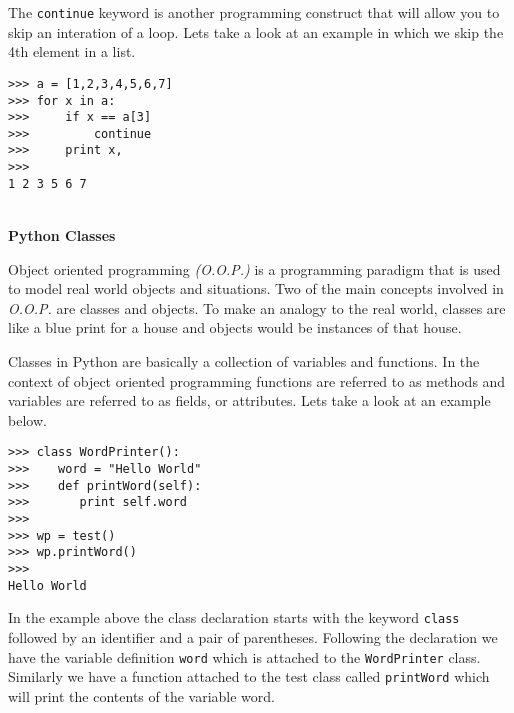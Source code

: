 \documentclass[letterpaper,11pt]{article}
\begin{document}
\par{The \texttt{continue} keyword is another programming construct that will
allow you to skip an interation of a loop. Lets take a look at an example in
which we skip the 4th element in a list.}
\begin{minipage}{.5\textwidth}
    \begin{tcolorbox}
        \begin{footnotesize}
            \begin{verbatim}
>>> a = [1,2,3,4,5,6,7]
>>> for x in a:
>>>     if x == a[3]
>>>         continue 
>>>     print x,
>>>
1 2 3 5 6 7
            \end{verbatim}
        \end{footnotesize}
    \end{tcolorbox}
\end{minipage}
\\
\textbf{Python Classes}
\par{Object oriented programming \textit{(O.O.P.)} is a programming paradigm
    that is used to model real world objects and situations. Two of the main
    concepts involved in \textit{O.O.P.} are classes and objects. To make an
    analogy to the real world, classes are like a blue print for a house and
objects would be instances of that house.}
\par{Classes in Python are basically a collection of variables and functions. In
the context of object oriented programming functions are referred to as methods
and variables are referred to as fields, or attributes. Lets take a look at an
example below.}
\\ 
\begin{minipage}{.5\textwidth}
    \begin{tcolorbox}
        \begin{footnotesize}
            \begin{verbatim}
>>> class WordPrinter():
>>>    word = "Hello World"
>>>    def printWord(self):
>>>       print self.word
>>>
>>> wp = test()
>>> wp.printWord()
>>>
Hello World
            \end{verbatim}
        \end{footnotesize}
    \end{tcolorbox}
\end{minipage}
\par{In the example above the class declaration starts with the keyword
\texttt{class} followed by an identifier and a pair of parentheses. Following
the declaration we have the variable definition \texttt{word} which is
attached to the \texttt{WordPrinter} class. Similarly we have a function attached to the
test class called \texttt{printWord} which will print the contents of the
variable word.}
\end{document}
